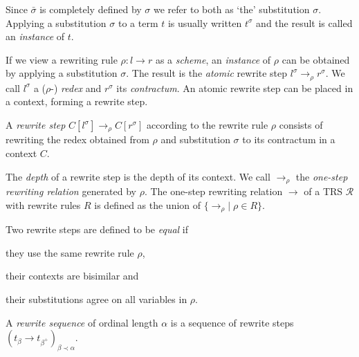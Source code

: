 Since $\bar{\sigma}$ is completely defined by $\sigma$ we refer to both as
`the' substitution $\sigma$.
Applying a substitution $\sigma$ to a term $t$ is usually written
$t^\sigma$ and the result is called an \emph{instance} of $t$.

If we view a rewriting rule $\rho : l \rightarrow r$ as a \emph{scheme}, an
\emph{instance} of $\rho$ can be obtained by applying a substitution
$\sigma$. The result is the \emph{atomic} rewrite step $l^\sigma
\rightarrow_\rho r^\sigma$. We call $l^\sigma$ a ($\rho$-) \emph{redex} and
$r^\sigma$ its \emph{contractum}. An atomic rewrite step can be placed in a
context, forming a rewrite step.

\begin{definition}%
A \emph{rewrite step} $C[l^\sigma] \rightarrow_\rho C[r^\sigma]$ according to
the rewrite rule $\rho$ consists of rewriting the redex obtained from
$\rho$ and substitution $\sigma$ to its contractum in a context $C$.
\end{definition}

The \emph{depth} of a rewrite step is the depth of its context. We
call $\rightarrow_\rho$ the \emph{one-step rewriting relation}
generated by $\rho$. The one-step rewriting relation $\rightarrow$ of
a TRS $\mathcal{R}$ with rewrite rules $R$ is defined as the union of
$\{ \rightarrow_\rho | \; \rho \in R \}$.

\begin{definition}\label{def:stepeq}%
Two rewrite steps are defined to be \emph{equal} if
\begin{compactenum}
  \item they use the same rewrite rule $\rho$,
  \item their contexts are bisimilar and
  \item their substitutions agree on all variables in $\rho$.
\end{compactenum}
\end{definition}

\begin{definition}%
A \emph{rewrite sequence} of ordinal length $\alpha$ is a sequence of rewrite
steps $(t_\beta \rightarrow t_{\beta^+})_{\beta \prec \alpha}$.
\end{definition}

